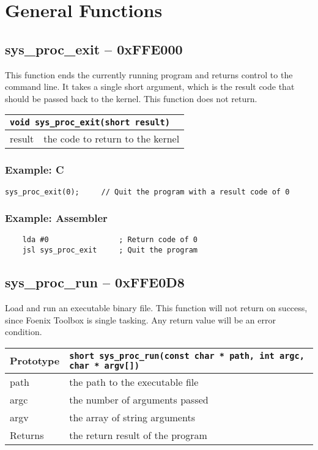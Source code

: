 \section{General Functions}

\subsection*{sys\_proc\_exit -- 0xFFE000}
This function ends the currently running program and returns control to the command line. It takes a single short argument, which is the result code that should be passed back to the kernel. This function does not return.

\bigskip

\begin{tabular}{|l|l|} \hline
\multicolumn{2}{|l|}{\lstinline!void sys_proc_exit(short result)!} \\ \hline\hline
result    & the code to return to the kernel \\ \hline
\end{tabular}

\subsubsection*{Example: C}
\begin{lstlisting}
sys_proc_exit(0);     // Quit the program with a result code of 0
\end{lstlisting}

\subsubsection*{Example: Assembler}
\begin{verbatim}
    lda #0                ; Return code of 0
    jsl sys_proc_exit     ; Quit the program
\end{verbatim}

\subsection*{sys\_proc\_run -- 0xFFE0D8}
Load and run an executable binary file.
This function will not return on success, since Foenix Toolbox is single tasking.
Any return value will be an error condition.

\bigskip

\begin{tabular}{|l||l|} \hline
Prototype & \lstinline!short sys_proc_run(const char * path, int argc, char * argv[])! \\ \hline
path & the path to the executable file \\ \hline
argc & the number of arguments passed \\ \hline
argv & the array of string arguments \\ \hline
Returns & the return result of the program \\ \hline
\end{tabular}

